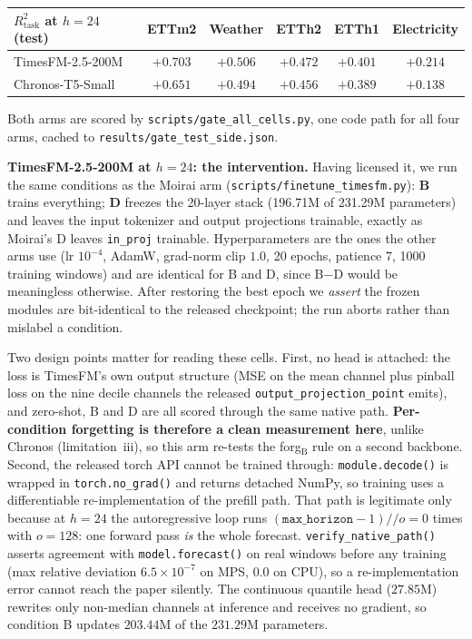\documentclass{article}
\begin{document}
\begin{center}
\small
\begin{tabular}{@{}lccccc@{}}
\toprule
$R^2_\text{task}$ at $h{=}24$ (test) & ETTm2 & Weather & ETTh2 & ETTh1 & Electricity \\
\midrule
TimesFM-2.5-200M & $+0.703$ & $+0.506$ & $+0.472$ & $+0.401$ & $+0.214$ \\
Chronos-T5-Small & $+0.651$ & $+0.494$ & $+0.456$ & $+0.389$ & $+0.138$ \\
\bottomrule
\end{tabular}
\end{center}

\noindent Both arms are scored by \texttt{scripts/gate\_all\_cells.py}, one code path for all four
arms, cached to \texttt{results/gate\_test\_side.json}.

\textbf{TimesFM-2.5-200M at $h{=}24$: the intervention.}
Having licensed it, we run the same conditions as the Moirai arm
(\texttt{scripts/finetune\_timesfm.py}): \textbf{B} trains everything; \textbf{D} freezes the
20-layer stack (196.71M of 231.29M parameters) and leaves the input tokenizer and output projections
trainable, exactly as Moirai's D leaves \texttt{in\_proj} trainable. Hyperparameters are the ones the
other arms use (lr $10^{-4}$, AdamW, grad-norm clip $1.0$, 20 epochs, patience 7, 1000 training
windows) and are identical for B and D, since B$-$D would be meaningless otherwise. After restoring
the best epoch we \emph{assert} the frozen modules are bit-identical to the released checkpoint; the
run aborts rather than mislabel a condition.

Two design points matter for reading these cells. First, no head is attached: the loss is TimesFM's
own output structure (MSE on the mean channel plus pinball loss on the nine decile channels the
released \texttt{output\_projection\_point} emits), and zero-shot, B and D are all scored through the
same native path. \textbf{Per-condition forgetting is therefore a clean measurement here}, unlike
Chronos (limitation~iii), so this arm re-tests the forg$_\text{B}$ rule on a second backbone.
Second, the released torch API cannot be trained through: \texttt{module.decode()} is wrapped in
\texttt{torch.no\_grad()} and returns detached NumPy, so training uses a differentiable
re-implementation of the prefill path. That path is legitimate only because at $h{=}24$ the
autoregressive loop runs $(\texttt{max\_horizon}-1)//o = 0$ times with $o{=}128$: one forward pass
\emph{is} the whole forecast. \texttt{verify\_native\_path()} asserts agreement with
\texttt{model.forecast()} on real windows before any training (max relative deviation
$6.5\times10^{-7}$ on MPS, $0.0$ on CPU), so a re-implementation error cannot reach the paper
silently. The continuous quantile head ($27.85$M) rewrites only non-median channels at inference and
receives no gradient, so condition B updates $203.44$M of the $231.29$M parameters.
\end{document}

